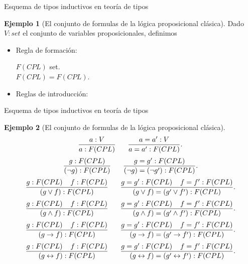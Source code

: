 \documentclass[dvipsnames, 8pt]{beamer} %
\theoremstyle{plain}
\theoremstyle{definition}
\newtheorem{ejemplo}{Ejemplo}
\begin{document}
\begin{frame}{Esquema de tipos inductivos en teoría de tipos}
    \begin{ejemplo}[El conjunto de formulas de la lógica proposicional clásica]
        Dado $V :set$ el conjunto de variables proposicionales, definimos\pause
        \begin{itemize}
            \item 
            Regla de formación:\pause
            \begin{center}
                $F(CPL)$ set.\\
                $F(CPL)=F(CPL)$.\pause
            \end{center}
            \item Reglas de introducción:
        \end{itemize}
    \end{ejemplo}
\end{frame}

\begin{frame}{Esquema de tipos inductivos en teoría de tipos}
    \begin{ejemplo}[El conjunto de formulas de la lógica proposicional clásica]
        $$\frac{a:V}{a:F(CPL)} \hspace{6mm} \frac{a=a':V}{a=a':F(CPL)}.$$
        $$\frac{g:F(CPL)}{(\lnot g):F(CPL)} \hspace{6mm} \frac{g=g':F(CPL)}{(\lnot g)=(\lnot g'):F(CPL)}.$$
        $$\frac{g:F(CPL)\hspace{4mm}f:F(CPL)}{(g\lor f):F(CPL)} \hspace{6mm} \frac{g=g':F(CPL)\hspace{4mm}f=f':F(CPL)}{(g\lor f)=(g'\lor f'):F(CPL)}.$$
        $$\frac{g:F(CPL)\hspace{4mm}f:F(CPL)}{(g\land f):F(CPL)} \hspace{6mm} \frac{g=g':F(CPL)\hspace{4mm}f=f':F(CPL)}{(g\land f)=(g'\land f'):F(CPL)}.$$
        $$\frac{g:F(CPL)\hspace{4mm}f:F(CPL)}{(g\rightarrow f):F(CPL)} \hspace{6mm} \frac{g=g':F(CPL)\hspace{4mm}f=f':F(CPL)}{(g\rightarrow f)=(g'\rightarrow f'):F(CPL)}.$$
        $$\frac{g:F(CPL)\hspace{4mm}f:F(CPL)}{(g\leftrightarrow f):F(CPL)} \hspace{6mm} \frac{g=g':F(CPL)\hspace{4mm}f=f':F(CPL)}{(g\leftrightarrow f)=(g'\leftrightarrow f'):F(CPL)}.$$
    \end{ejemplo}
\end{frame}
\end{document}
